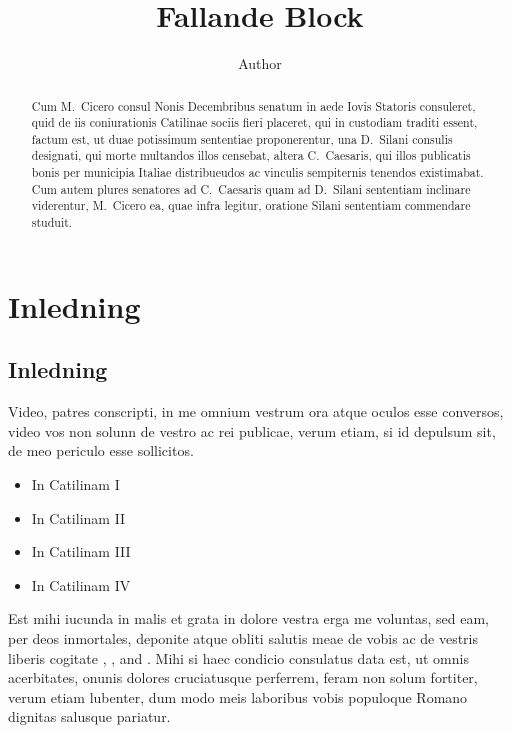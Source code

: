 \documentclass[a4paper,12pt,twoside,swedish]{report}
\begin{document}
\pagestyle{empty}

\title{Fallande Block}
\author{Author}
\date{}

\maketitle

\begin{abstract}
Cum M.~Cicero consul Nonis Decembribus senatum in aede
Iovis Statoris consuleret, quid de iis coniurationis Catilinae
sociis fieri placeret, qui in custodiam traditi essent, factum
est, ut duae potissimum sententiae proponerentur, una D.~Silani consulis
designati, qui morte multandos illos censebat,
altera C.~Caesaris, qui illos publicatis bonis per municipia
Italiae distribueudos ac vinculis sempiternis tenendos existimabat. Cum
autem plures senatores ad C.~Caesaris quam ad
D.~Silani sententiam inclinare viderentur, M.~Cicero ea, quae
infra legitur, oratione Silani sententiam commendare studuit.
\vfill
\end{abstract}

\tableofcontents  %
\listoffigures    %
\listoftables     %


\pagestyle{plain}

\chapter{Inledning}
\setcounter{page}{1}

\section{Inledning}

Video, patres conscripti, in me omnium vestrum ora atque oculos esse
conversos, video vos non solunn de vestro ac rei publicae, verum etiam,
si id depulsum sit, de meo periculo esse sollicitos. 
\begin{itemize}
\item In Catilinam I
\item In Catilinam II
\item In Catilinam III
\item In Catilinam IV
\end{itemize}
Est mihi iucunda in
malis et grata in dolore vestra erga me voluntas, sed eam, per deos
inmortales, deponite atque obliti salutis meae de vobis ac de vestris
liberis cogitate \cite{AbTaRu:54},  \cite{Abl:56}, \cite{Keo:58} and \cite{Pow:85}. Mihi si haec condicio consulatus data est, ut omnis
acerbitates, onunis dolores cruciatusque perferrem, feram non solum
fortiter, verum etiam lubenter, dum modo meis laboribus vobis populoque
Romano dignitas salusque pariatur.
\end{document}
